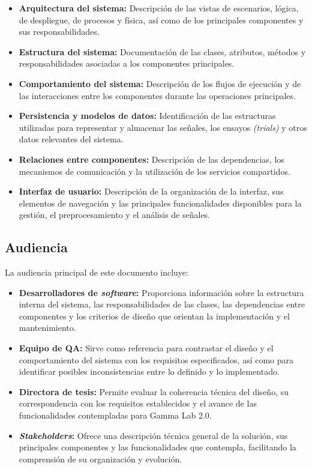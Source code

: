 \documentclass[12pt,letterpaper,oneside]{article}
\DeclareRobustCommand{\_}{\textunderscore\allowbreak}
\begin{document}
    \begin{itemize}
        \item \textbf{Arquitectura del sistema:} Descripción de las vistas de escenarios, lógica, de despliegue, de procesos y física, así como de los principales componentes y sus responsabilidades.
        \item \textbf{Estructura del sistema:} Documentación de las clases, atributos, métodos y responsabilidades asociadas a los componentes principales.
        \item \textbf{Comportamiento del sistema:} Descripción de los flujos de ejecución y de las interacciones entre los componentes durante las operaciones principales.
        \item \textbf{Persistencia y modelos de datos:} Identificación de las estructuras utilizadas para representar y almacenar las señales, los ensayos \textit{(trials)} y otros datos relevantes del sistema.
        \item \textbf{Relaciones entre componentes:} Descripción de las dependencias, los mecanismos de comunicación y la utilización de los servicios compartidos.
        \item \textbf{Interfaz de usuario:} Descripción de la organización de la interfaz, sus elementos de navegación y las principales funcionalidades disponibles para la gestión, el preprocesamiento y el análisis de señales.
    \end{itemize}

    \subsection{Audiencia}
    La audiencia principal de este documento incluye:
    \begin{itemize}
        \item \textbf{Desarrolladores de \textit{software}:} Proporciona información sobre la estructura interna del sistema, las responsabilidades de las clases, las dependencias entre componentes y los criterios de diseño que orientan la implementación y el mantenimiento.
        \item \textbf{Equipo de QA:} Sirve como referencia para contrastar el diseño y el comportamiento del sistema con los requisitos especificados, así como para identificar posibles inconsistencias entre lo definido y lo implementado.
        \item \textbf{Directora de tesis:} Permite evaluar la coherencia técnica del diseño, su correspondencia con los requisitos establecidos y el avance de las funcionalidades contempladas para Gamma Lab 2.0.
        \item \textbf{\textit{Stakeholders}:} Ofrece una descripción técnica general de la solución, sus principales componentes y las funcionalidades que contempla, facilitando la comprensión de su organización y evolución.
    \end{itemize}
\end{document}
